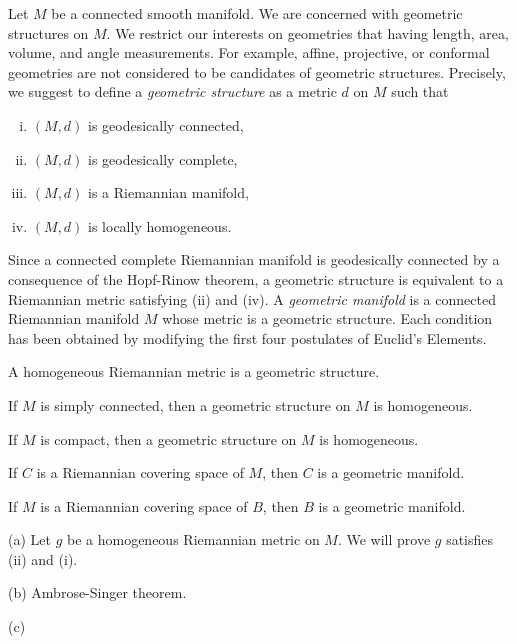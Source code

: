 \documentclass{../../large}
\begin{document}
\begin{prb}
Let $M$ be a connected smooth manifold.
We are concerned with geometric structures on $M$.
We restrict our interests on geometries that having length, area, volume, and angle measurements.
For example, affine, projective, or conformal geometries are not considered to be candidates of geometric structures.
Precisely, we suggest to define a \emph{geometric structure} as a metric $d$ on $M$ such that
\begin{enumerate}[(i)]
\item $(M,d)$ is geodesically connected,
\item $(M,d)$ is geodesically complete,
\item $(M,d)$ is a Riemannian manifold,
\item $(M,d)$ is locally homogeneous.
\end{enumerate}
Since a connected complete Riemannian manifold is geodesically connected by a consequence of the Hopf-Rinow theorem, a geometric structure is equivalent to a Riemannian metric satisfying (ii) and (iv).
A \emph{geometric manifold} is a connected Riemannian manifold $M$ whose metric is a geometric structure.
Each condition has been obtained by modifying the first four postulates of Euclid's Elements.
\begin{parts}
\item A homogeneous Riemannian metric is a geometric structure.
\item If $M$ is simply connected, then a geometric structure on $M$ is homogeneous.
\item If $M$ is compact, then a geometric structure on $M$ is homogeneous.
\item If $C$ is a Riemannian covering space of $M$, then $C$ is a geometric manifold.
\item If $M$ is a Riemannian covering space of $B$, then $B$ is a geometric manifold.
\end{parts}
\end{prb}
\begin{pf}
(a)
Let $g$ be a homogeneous Riemannian metric on $M$.
We will prove $g$ satisfies (ii) and (i).

(b) %
Ambrose-Singer theorem.

(c)
\end{pf}
\end{document}
